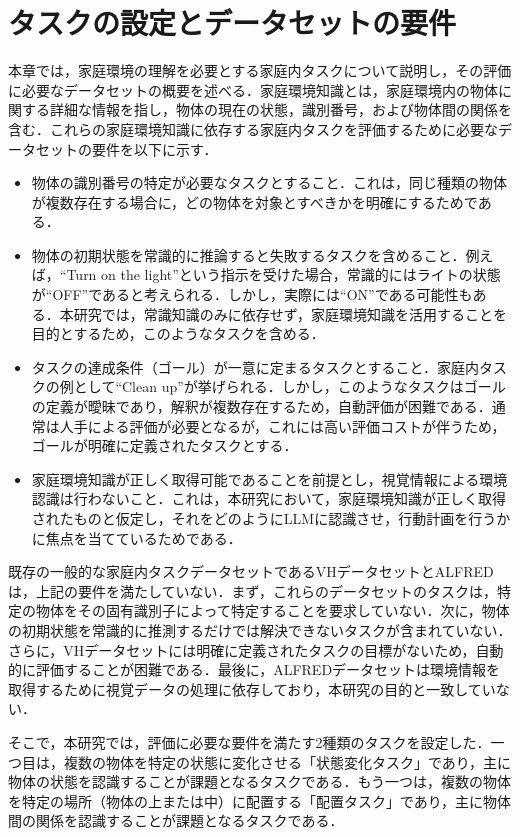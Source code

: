 \section{タスクの設定とデータセットの要件} \label{sec3}
本章では，家庭環境の理解を必要とする家庭内タスクについて説明し，その評価に必要なデータセットの概要を述べる．家庭環境知識とは，家庭環境内の物体に関する詳細な情報を指し，物体の現在の状態，識別番号，および物体間の関係を含む．これらの家庭環境知識に依存する家庭内タスクを評価するために必要なデータセットの要件を以下に示す．

\begin{itemize}
    \item 物体の識別番号の特定が必要なタスクとすること．これは，同じ種類の物体が複数存在する場合に，どの物体を対象とすべきかを明確にするためである．
    \item 物体の初期状態を常識的に推論すると失敗するタスクを含めること．例えば，``Turn on the light''という指示を受けた場合，常識的にはライトの状態が``OFF''であると考えられる．しかし，実際には``ON''である可能性もある．本研究では，常識知識のみに依存せず，家庭環境知識を活用することを目的とするため，このようなタスクを含める．
    \item タスクの達成条件（ゴール）が一意に定まるタスクとすること．家庭内タスクの例として``Clean up''が挙げられる．しかし，このようなタスクはゴールの定義が曖昧であり，解釈が複数存在するため，自動評価が困難である．通常は人手による評価が必要となるが，これには高い評価コストが伴うため，ゴールが明確に定義されたタスクとする．
    \item 家庭環境知識が正しく取得可能であることを前提とし，視覚情報による環境認識は行わないこと．これは，本研究において，家庭環境知識が正しく取得されたものと仮定し，それをどのようにLLMに認識させ，行動計画を行うかに焦点を当てているためである．
\end{itemize}

既存の一般的な家庭内タスクデータセットであるVHデータセットとALFREDは，上記の要件を満たしていない．まず，これらのデータセットのタスクは，特定の物体をその固有識別子によって特定することを要求していない．次に，物体の初期状態を常識的に推測するだけでは解決できないタスクが含まれていない．さらに，VHデータセットには明確に定義されたタスクの目標がないため，自動的に評価することが困難である．最後に，ALFREDデータセットは環境情報を取得するために視覚データの処理に依存しており，本研究の目的と一致していない．

そこで，本研究では，評価に必要な要件を満たす2種類のタスクを設定した．一つ目は，複数の物体を特定の状態に変化させる「状態変化タスク」であり，主に物体の状態を認識することが課題となるタスクである．もう一つは，複数の物体を特定の場所（物体の上または中）に配置する「配置タスク」であり，主に物体間の関係を認識することが課題となるタスクである．